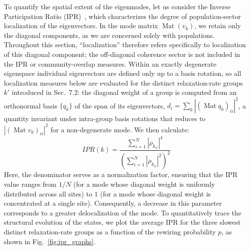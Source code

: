 \documentclass[pdflatex,sn-mathphys-num]{sn-jnl}
\begin{document}
To quantify the spatial extent of the eigenmodes, let us consider the Inverse Participation Ratio (IPR)~\cite{farkas},
which characterizes the degree of population-sector localization of the eigenvectors. In the mode matrix $\operatorname{Mat}(v_k)$, we retain only the diagonal components, as we are concerned solely with populations. Throughout this section, ``localization'' therefore refers specifically to localization of this diagonal component; the off-diagonal coherence sector is not included in the IPR or community-overlap measures.
Within an exactly degenerate eigenspace individual eigenvectors are defined only up to a basis rotation, so all localization measures below are evaluated for the distinct relaxation-rate groups $k'$ introduced in Sec.~7.2: the diagonal weight of a group is computed from an orthonormal basis $\{q_k\}$ of the span of its eigenvectors, $d_i = \sum_k |(\operatorname{Mat} q_k)_{ii}|^2$, a quantity invariant under intra-group basis rotations that reduces to $|(\operatorname{Mat} v_k)_{ii}|^2$ for a non-degenerate mode.
We then calculate:
\begin{equation}
IPR(k)=\frac{\sum_{i=1}^N |\rho_{k_{ii}}|^4}{(\sum_{i=1}^N |\rho_{k_{ii}}|^2)^2}
\label{eq:IPR}
\end{equation}
Here, the denominator serves as a normalization factor, ensuring that the IPR value ranges from $1/N$ (for a mode whose diagonal weight is uniformly distributed across all sites) to $1$ (for a mode whose diagonal weight is concentrated at a single site). Consequently, a decrease in this parameter corresponds to a greater delocalization of the mode. To quantitatively trace the structural evolution of the states, we plot the average IPR for the three slowest distinct relaxation-rate groups as a function of the rewiring probability $p$, as shown in Fig.~\ref{fig:ipr_graphs}.
\end{document}

